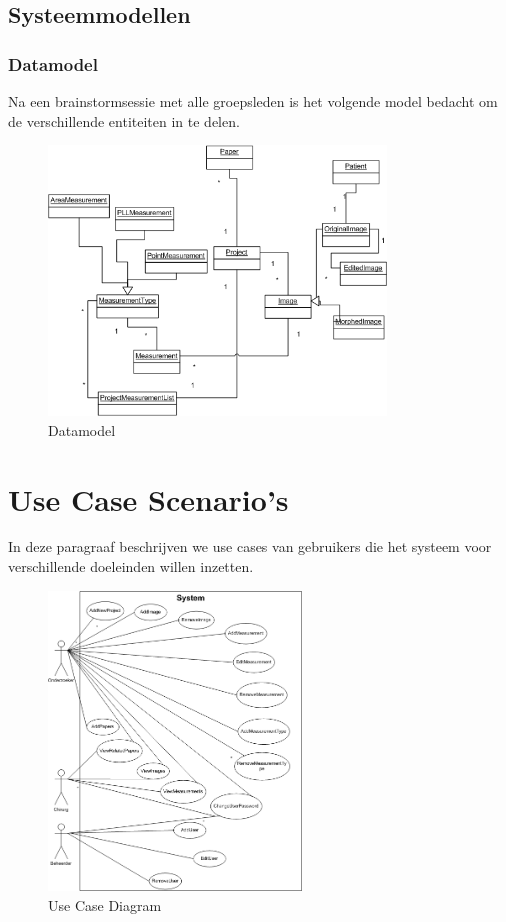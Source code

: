 \subsection{Systeemmodellen}
\subsubsection{Datamodel}
Na een brainstormsessie met alle groepsleden is het volgende model bedacht om de verschillende entiteiten in te delen.
\begin{figure}[htp]
\begin{center}
	\includegraphics[width=0.8\textwidth]{brainstorm_klassediagram}
\caption{Datamodel}
\label{default}
\end{center}
\end{figure}

\newpage
\section{Use Case Scenario's}

In deze paragraaf beschrijven we use cases van gebruikers die het systeem voor verschillende doeleinden willen inzetten.
\begin{figure}[htp]
\begin{center}
	\includegraphics[width=0.6\textwidth]{UseCaseDiagram}
\caption{Use Case Diagram}
\label{default}
\end{center}
\end{figure}


